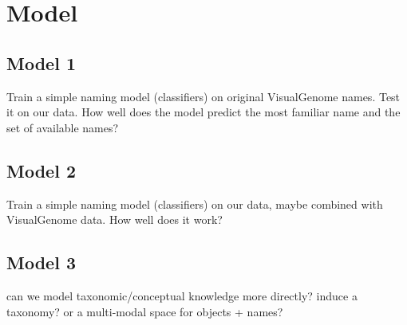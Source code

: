 \section{Model}

\subsection{Model 1}
Train a simple naming model (classifiers) on original VisualGenome names. Test it on our data. How well does the model predict the most familiar name and the set of available names?

\subsection{Model 2}
Train a simple naming model (classifiers) on our data, maybe combined with VisualGenome data. How well does it work?

\subsection{Model 3}

can we model taxonomic/conceptual knowledge more directly? induce a taxonomy? or a multi-modal space for objects + names?

